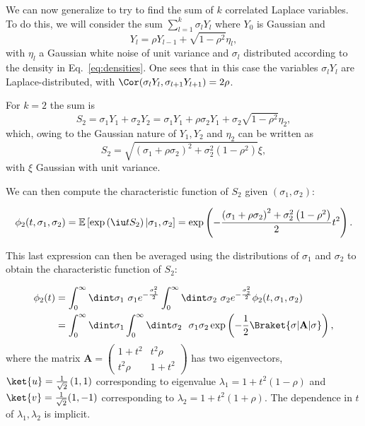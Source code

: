 We can now generalize to try to find the sum of $k$ correlated Laplace variables. To do this, we will consider the sum $\sum_{l=1}^{k}\sigma_l Y_l$ where $Y_0$ is Gaussian and
\begin{equation}\label{eq:ar1}
Y_{l} = \rho Y_{l-1} + \sqrt{1-\rho^2} \eta_l, 
\end{equation}
with $\eta_l$ a Gaussian white noise of unit variance and $\sigma_l$ distributed according to the density in Eq.~\eqref{eq:densities}. One sees that in this case the variables $\sigma_l Y_l$ are Laplace-distributed, with $\Cor(\sigma_l Y_l, \sigma_{l+1}Y_{l+1})=2\rho $. 

For $k=2$ the sum is 
\begin{equation}\label{eq:s2}
 S_2 = \sigma_1Y_1 + \sigma_2 Y_2 = \sigma_1 Y_1 + \rho \sigma_2 Y_1 + \sigma_2 \sqrt{1-\rho^2}\eta_2,
 \end{equation} 
 which, owing to the Gaussian nature of $Y_1,Y_2$ and $\eta_2$ can be written as
 \begin{equation}\label{eq:rewriting}
 S_2 = \sqrt{\left(\sigma_1 + \rho\sigma_2\right)^2 + \sigma_2^2 \left(1-\rho^2\right)}\xi,
 \end{equation}
 with $\xi$ Gaussian with unit variance. 

 We can then compute the characteristic function of $S_2$ given $(\sigma_1,\sigma_2)$:

\begin{equation}
    \phi_2(t,\sigma_1,\sigma_2)=\mathbb{E}\left[\exp\left(\iu t S_2\right) |\sigma_1, \sigma_2\right] = \exp\left(-\frac{\left(\sigma_1 + \rho\sigma_2\right)^2 + \sigma_2^2 \left(1-\rho^2\right)}{2}t^2\right).
\end{equation}


This last expression can then be averaged using the distributions of $\sigma_1$ and $\sigma_2$ to obtain the characteristic function of $S_2$:

\begin{equation}\label{eq:nasty_int}
\begin{split}
\phi_2(t) &= \int_{0}^{\infty}\dint \sigma_1~\sigma_1e^{-\frac{\sigma_1^2}{2}}\int_{0}^{\infty}\dint \sigma_2~\sigma_2e^{-\frac{\sigma_2^2}{2}}\phi_2(t,\sigma_1,\sigma_2)\\
&= \int_{0}^{\infty}\dint \sigma_1 \int_{0}^{\infty}\dint \sigma_2~~\sigma_1\sigma_2 \exp\left(-\frac{1}{2}\Braket{\sigma | \mathbf{A} | \sigma}\right),
\end{split}
\end{equation}
where the matrix $\mathbf{A}= \left( \begin{matrix}
1+t^2 & t^2\rho \\ t^2\rho & 1+t^2
\end{matrix}  \right)$ has two eigenvectors, $\ket{u} = \frac{1}{\sqrt{2}}\left(1,1\right)$ corresponding to eigenvalue $\lambda_1 = 1+t^2\left(1-\rho\right)$  and $\ket{v}=\frac{1}{\sqrt{2}}(1,-1)$ corresponding to  $\lambda_2 = 1+t^2\left(1+\rho\right)$. The dependence in $t$ of $\lambda_1,\lambda_2$ is implicit.


